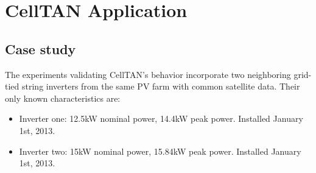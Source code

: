 \chapter{CellTAN Application} \label{chap:chap5}


\section{Case study}


The experiments validating CellTAN's behavior incorporate two neighboring grid-tied string inverters from the same PV farm with common satellite data. Their only known characteristics are:

\begin{itemize}
    \item Inverter one: 12.5kW nominal power, 14.4kW peak power. Installed January 1st, 2013.
    \item Inverter two: 15kW nominal power, 15.84kW peak power. Installed January 1st, 2013.
\end{itemize}

